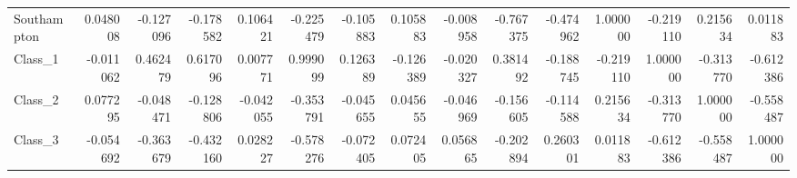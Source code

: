 \begin{tabular}{lrrrrrrrrrrrrrr}
Southampton &     0.048008 & -0.127096 & -0.178582 &     0.106421 &  -0.225479 & -0.105883 &  0.105883 &    -0.008958 &  -0.767375 &   -0.474962 &     1.000000 & -0.219110 &  0.215634 &  0.011883 \\
Class\_1     &    -0.011062 &  0.462479 &  0.617096 &     0.007771 &   0.999099 &  0.126389 & -0.126389 &    -0.020327 &   0.381492 &   -0.188745 &    -0.219110 &  1.000000 & -0.313770 & -0.612386 \\
Class\_2     &     0.077295 & -0.048471 & -0.128806 &    -0.042055 &  -0.353791 & -0.045655 &  0.045655 &    -0.046969 &  -0.156605 &   -0.114588 &     0.215634 & -0.313770 &  1.000000 & -0.558487 \\
Class\_3     &    -0.054692 & -0.363679 & -0.432160 &     0.028227 &  -0.578276 & -0.072405 &  0.072405 &     0.056865 &  -0.202894 &    0.260301 &     0.011883 & -0.612386 & -0.558487 &  1.000000 \\
\bottomrule
\end{tabular}
